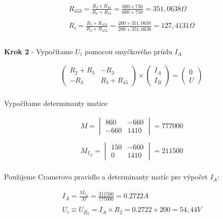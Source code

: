 \begin{gather*}
    R_{453} = \frac {R_{3} \times R_{45}} {R_{3} + R_{45}} =  \frac {660 \times 750} {660 + 750} = 351,0638 \Omega \\\\
   R_{i} = \frac {R_{2} \times R_{453}} {R_{2} + R_{453}} = \frac {200 \times 351,0638} {200 + 351,0638} = 127,4131 \Omega \\\\
\end{gather*}

\begin{center}
    \textbf{Krok 2} - Vypočítame $U_i$ pomocou smyčkového prúdu $I_A$
\end{center}

\begin{gather*}
    \begin{pmatrix}
    R_2 + R_3 & -R_3 \\
    -R_3 & R_3 + R_{45}
    \end{pmatrix}
    \times
    \begin{pmatrix}
    I_A \\
    I_B
    \end{pmatrix}
    =
    \begin{pmatrix}
    0 \\
    U
    \end{pmatrix}
\end{gather*}
\\

Vypočítame determinanty matice

\begin{gather*}
    M =
    \begin{vmatrix}
    860 & -660 \\
    -660 & 1410
    \end{vmatrix}
    =
    777000
    \\\\
    M_{I_A} =
    \begin{vmatrix}
    150 & -660 \\
    0 & 1410
    \end{vmatrix}
    =
    211500
\end{gather*}
\\

Použijeme Cramerovo pravidlo a determinanty matíc pre výpočet $I_A$:

\begin{gather*}
    I_A = \frac{M_{I_A}}{M} = \frac{211500}{777000} = 0.2722 A
    \\\\
    U_i \equiv U_{R_2} = I_A \times R_2 = 0.2722 \times 200 = 54,44 V
\end{gather*}

